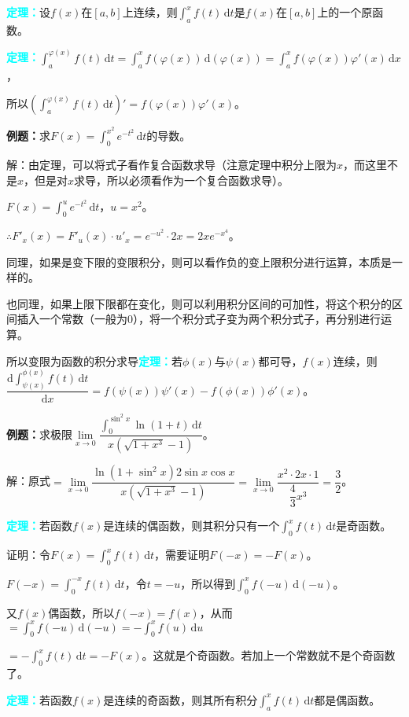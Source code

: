 \documentclass[UTF8, 12pt]{ctexart}
\begin{document}
\textcolor{aqua}{\textbf{定理：}}设$f(x)$在$[a,b]$上连续，则$\int_a^xf(t)\,\textrm{d}t$是$f(x)$在$[a,b]$上的一个原函数。

\textcolor{aqua}{\textbf{定理：}}$\int_a^{\varphi(x)}f(t)\,\textrm{d}t=\int_a^xf(\varphi(x))\,\textrm{d}(\varphi(x))=\int_a^xf(\varphi(x))\varphi'(x)\,\textrm{d}x$，

所以$(\int_a^{\varphi(x)}f(t)\,\textrm{d}t)'=f(\varphi(x))\varphi'(x)$。

\textbf{例题：}求$F(x)=\int_0^{x^2}e^{-t^2}\,\textrm{d}t$的导数。

解：由定理，可以将式子看作复合函数求导（注意定理中积分上限为$x$，而这里不是$x$，但是对$x$求导，所以必须看作为一个复合函数求导）。

$F(x)=\int_0^ue^{-t^2}\,\textrm{d}t$，$u=x^2$。

$\therefore F'_x(x)=F'_u(x)\cdot u'_x=e^{-u^2}\cdot 2x=2xe^{-x^4}$。

同理，如果是变下限的变限积分，则可以看作负的变上限积分进行运算，本质是一样的。

也同理，如果上限下限都在变化，则可以利用积分区间的可加性，将这个积分的区间插入一个常数（一般为0），将一个积分式子变为两个积分式子，再分别进行运算。

所以变限为函数的积分求导\textcolor{aqua}{\textbf{定理：}}若$\phi(x)$与$\psi(x)$都可导，$f(x)$连续，则$\dfrac{\textrm{d}\int_{\psi(x)}^{\phi(x)}f(t)\,\textrm{d}t}{\textrm{d}x}=f(\psi(x))\psi'(x)-f(\phi(x))\phi'(x)$。

\textbf{例题：}求极限$\lim\limits_{x\to 0}\dfrac{\int_0^{\sin^2x}\ln(1+t)\,\textrm{d}t}{x(\sqrt{1+x^3}-1)}$。

解：原式$=\lim\limits_{x\to 0}\dfrac{\ln(1+\sin^2x)2\sin x\cos x}{x(\sqrt{1+x^3}-1)}=\lim\limits_{x\to 0}\dfrac{x^2\cdot 2x\cdot 1}{\dfrac{4}{3}x^3}=\dfrac{3}{2}$。\smallskip

\textcolor{aqua}{\textbf{定理：}}若函数$f(x)$是连续的偶函数，则其积分只有一个$\int^x_0f(t)\,\textrm{d}t$是奇函数。

证明：令$F(x)=\int_0^xf(t)\,\textrm{d}t$，需要证明$F(-x)=-F(x)$。

$F(-x)=\int_0^{-x}f(t)\,\textrm{d}t$，令$t=-u$，所以得到$\int_0^xf(-u)\,\textrm{d}(-u)$。

又$f(x)$偶函数，所以$f(-x)=f(x)$，从而$=\int_0^xf(-u)\,\textrm{d}(-u)=-\int_0^xf(u)\,\textrm{d}u$

$=-\int_0^xf(t)\,\textrm{d}t=-F(x)$。这就是个奇函数。若加上一个常数就不是个奇函数了。

\textcolor{aqua}{\textbf{定理：}}若函数$f(x)$是连续的奇函数，则其所有积分$\int^x_af(t)\,\textrm{d}t$都是偶函数。
\end{document}
